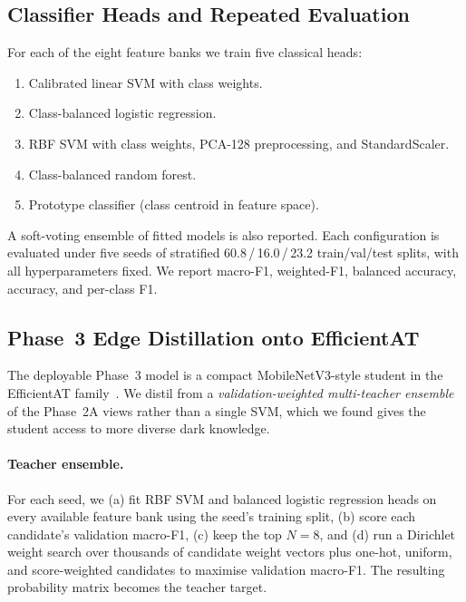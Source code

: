 \documentclass[11pt,a4paper]{article}
\begin{document}
\subsection{Classifier Heads and Repeated Evaluation}
\label{sec:classifiers}

For each of the eight feature banks we train five classical heads:

\begin{enumerate}[nosep]
  \item Calibrated linear SVM with class weights.
  \item Class-balanced logistic regression.
  \item RBF SVM with class weights, PCA-128 preprocessing, and
        StandardScaler.
  \item Class-balanced random forest.
  \item Prototype classifier (class centroid in feature space).
\end{enumerate}

A soft-voting ensemble of fitted models is also reported. Each
configuration is evaluated under five seeds of stratified 60.8\,/\,16.0\,/\,23.2
train/val/test splits, with all hyperparameters fixed. We report
macro-F1, weighted-F1, balanced accuracy, accuracy, and per-class F1.

\subsection{Phase~3 Edge Distillation onto EfficientAT}
\label{sec:distill}

The deployable Phase~3 model is a compact MobileNetV3-style student in
the EfficientAT family~\cite{schmid2023efficientat}. We distil from a
\emph{validation-weighted multi-teacher ensemble} of the Phase~2A views
rather than a single SVM, which we found gives the student access to
more diverse dark knowledge.

\paragraph{Teacher ensemble.}
For each seed, we (a) fit RBF SVM and balanced logistic regression heads
on every available feature bank using the seed's training split,
(b) score each candidate's validation macro-F1, (c) keep the top
$N{=}8$, and (d) run a Dirichlet weight search over thousands of
candidate weight vectors plus one-hot, uniform, and score-weighted
candidates to maximise validation macro-F1. The resulting probability
matrix becomes the teacher target.
\end{document}
